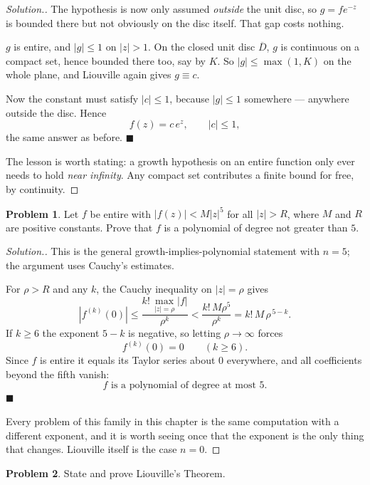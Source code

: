 \documentclass[11pt,a4paper]{article}
\theoremstyle{definition}
\newtheorem{problemx}{Problem}[section]
\newenvironment{problem}{\begin{problemx}}{\end{problemx}}
\newenvironment{solution}
  {\renewcommand{\qedsymbol}{}\begin{proof}[\textit{Solution}.]}
  {\end{proof}}
\begin{document}
\begin{solution}
The hypothesis is now only assumed \emph{outside} the unit disc, so $g = fe^{-z}$
is bounded there but not obviously on the disc itself. That gap costs nothing.

$g$ is entire, and $\left|g\right| \leq 1$ on $\left|z\right| > 1$. On the closed
unit disc $\overline{D}$, $g$ is continuous on a compact set, hence bounded there
too, say by $K$. So $\left|g\right| \leq \max(1,K)$ on the whole plane, and
Liouville again gives $g \equiv c$.

Now the constant must satisfy $\left|c\right| \leq 1$, because
$\left|g\right| \leq 1$ somewhere --- anywhere outside the disc. Hence
$$\boxed{f(z) = c\,e^{z},\qquad \left|c\right| \leq 1 ,}$$
the same answer as before. $\blacksquare$

The lesson is worth stating: a growth hypothesis on an entire function only ever
needs to hold \emph{near infinity}. Any compact set contributes a finite bound for
free, by continuity.
\end{solution}


\begin{problem}
Let $f$ be entire with $\left|f(z)\right| < M\left|z\right|^{5}$ for all
$\left|z\right| > R$, where $M$ and $R$ are positive constants. Prove that $f$ is
a polynomial of degree not greater than $5$.
\end{problem}

\begin{solution}
This is the general growth-implies-polynomial statement with $n = 5$; the
argument uses Cauchy's estimates.

For $\rho > R$ and any $k$, the Cauchy inequality on $\left|z\right| = \rho$ gives
$$\left|f^{(k)}(0)\right| \leq \frac{k!\,\max_{\left|z\right|=\rho}\left|f\right|}{\rho^{k}}
< \frac{k!\,M\rho^{5}}{\rho^{k}} = k!\,M\,\rho^{\,5-k}.$$
If $k \geq 6$ the exponent $5-k$ is negative, so letting $\rho \to \infty$ forces
$$f^{(k)}(0) = 0 \qquad (k \geq 6).$$
Since $f$ is entire it equals its Taylor series about $0$ everywhere, and all
coefficients beyond the fifth vanish:
$$\boxed{f \text{ is a polynomial of degree at most } 5 .}$$
$\blacksquare$

Every problem of this family in this chapter is the same computation with a
different exponent, and it is worth seeing once that the exponent is the only thing
that changes. Liouville itself is the case $n = 0$.
\end{solution}


\begin{problem}
State and prove Liouville's Theorem.
\end{problem}
\end{document}
